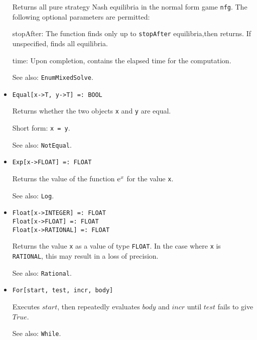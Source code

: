 \begin{itemize}
\bd
Returns all pure strategy Nash equilibria in the
normal form game \verb+nfg+.  The following optional parameters are
permitted:
\bd
\item
[stopAfter:] The function finds only up to \verb+stopAfter+ equilibria,then returns.  If unspecified, finds all equilibria.
\item
[time:] Upon completion, contains the elapsed time for the computation.
\ed
\item
[See also:] {\tt EnumMixedSolve}.
\ed

\item
\protect \large \begin{verbatim}
Equal[x->T, y->T] =: BOOL
\end{verbatim}\normalsize

\bd
Returns whether the two objects \verb+x+ and \verb+y+ are
equal.
\item
[Short form:] \verb+x = y+.
\item
[See also:] {\tt NotEqual}.
\ed

\item
\protect \large \begin{verbatim}
Exp[x->FLOAT] =: FLOAT
\end{verbatim} \normalsize

\bd
Returns the value of the function ${\rm e}^{x}$ for the
value \verb+x+.
\item
[See also:] {\tt Log}.
\ed



\item
\protect \large \begin{verbatim}
Float[x->INTEGER] =: FLOAT
Float[x->FLOAT] =: FLOAT
Float[x->RATIONAL] =: FLOAT
\end{verbatim} \normalsize

\bd
Returns the value \verb+x+ as a value of type {\tt FLOAT}.
In the case where \verb+x+ is {\tt RATIONAL}, this may result in a loss
of precision.
\item
[See also:] {\tt Rational}.
\ed

\item
\protect \large \begin{verbatim}
For[start, test, incr, body]
\end{verbatim}\normalsize

\bd
Executes $start$, then repeatedly evaluates $body$ and $incr$
until $test$ fails to give $True$.
\item
[See also:] \verb+While+.
\ed


\end{itemize}
